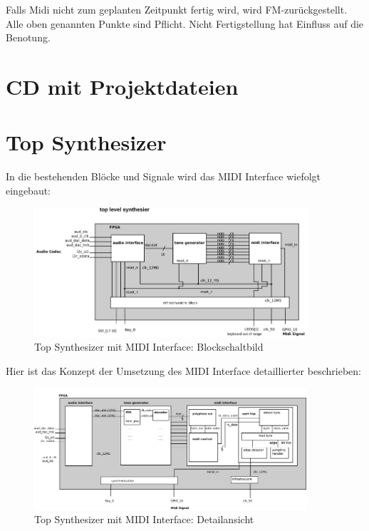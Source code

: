 Falls Midi nicht zum geplanten Zeitpunkt fertig wird, wird FM-zurückgestellt. Alle oben genannten Punkte sind Pflicht.
Nicht Fertigstellung hat Einfluss auf die Benotung.



\chapter{CD mit Projektdateien}\label{sect.anhang_cd}


\chapter{Top Synthesizer}\label{chap.anhang_top_synthesizer}

In die bestehenden Blöcke und Signale wird das MIDI Interface wiefolgt eingebaut:\\
\begin{figure}[H]
	\centering
	\includegraphics[width=0.9\textwidth]{images/midi_interface/top_synthesizer_block_saled.png}
	\caption{Top Synthesizer mit MIDI Interface: Blockschaltbild}
	\label{fig.top_synthesizer_block}
\end{figure}

Hier ist das Konzept der Umsetzung des MIDI Interface detaillierter beschrieben:\\
\begin{figure}[H]
	\centering
	\includegraphics[width=0.9\textwidth]{images/midi_interface/top_synthesizer_detail_scaled.png}
	\caption{Top Synthesizer mit MIDI Interface: Detailansicht}
	\label{fig.top_synthesizer_detail}
\end{figure}


